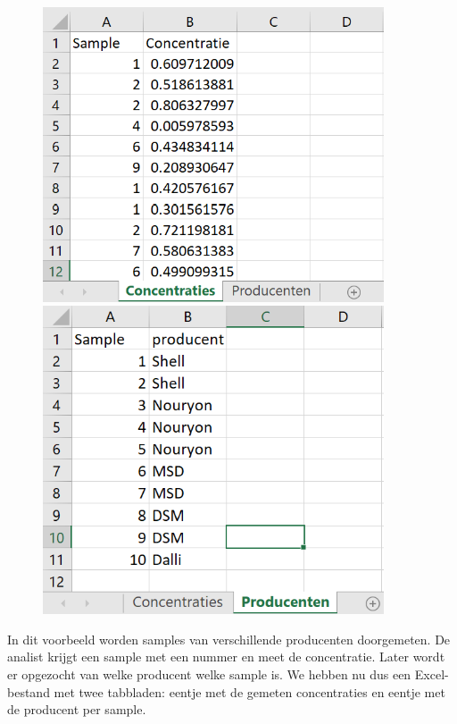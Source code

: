 \begin{figure}[h]
    \centering
    \begin{minipage}{0.45\textwidth}
        \centering
        \includegraphics[width=0.9\textwidth]{img/index1.png} 
    \end{minipage}\hfill
    \begin{minipage}{0.45\textwidth}
        \centering
        \includegraphics[width=0.9\textwidth]{img/index2.png}
    \end{minipage}
\end{figure}

In dit voorbeeld worden samples van verschillende producenten doorgemeten. De analist krijgt een sample met een nummer en meet de concentratie. Later wordt er opgezocht van welke producent welke sample is. We hebben nu dus een Excel-bestand met twee tabbladen: eentje met de gemeten concentraties en eentje met de producent per sample.

